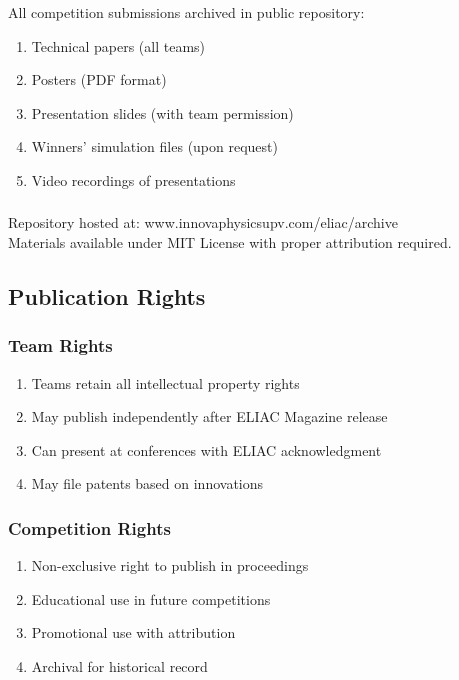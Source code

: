 \subsubsection{}
All competition submissions archived in public repository:
\begin{enumerate}[noitemsep]
    \item Technical papers (all teams)
    \item Posters (PDF format)
    \item Presentation slides (with team permission)
    \item Winners' simulation files (upon request)
    \item Video recordings of presentations
\end{enumerate}

\subsubsection{}
Repository hosted at: www.innovaphysicsupv.com/eliac/archive \\
Materials available under MIT License with proper attribution required.

\subsection{Publication Rights}

\subsubsection{Team Rights}
\begin{enumerate}[noitemsep]
    \item Teams retain all intellectual property rights
    \item May publish independently after ELIAC Magazine release
    \item Can present at conferences with ELIAC acknowledgment
    \item May file patents based on innovations
\end{enumerate}

\subsubsection{Competition Rights}
\begin{enumerate}[noitemsep]
    \item Non-exclusive right to publish in proceedings
    \item Educational use in future competitions
    \item Promotional use with attribution
    \item Archival for historical record
\end{enumerate}


